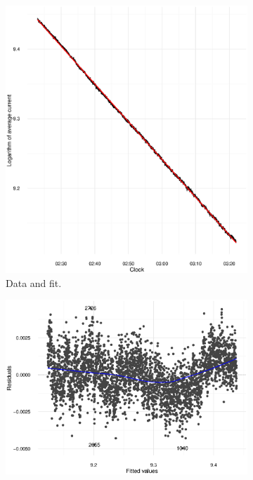 \documentclass[reprint]{revtex4-1}
\newcommand{\scl}{.39}
\begin{document}
\begin{figure}
\centering
\begin{subfigure}{.5\textwidth}
\includegraphics[scale=\scl]{img/Run969_Data_AND_Fit.eps}
\caption{Data and fit.}
\end{subfigure}
\begin{subfigure}{.5\textwidth}
\includegraphics[scale=\scl]{img/Run969_Res_VS_Fit.eps}

\end{subfigure}
\end{figure}
\end{document}
